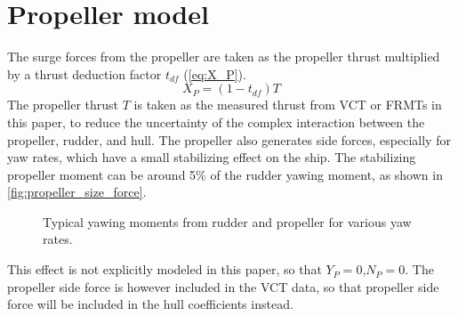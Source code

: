 \section{Propeller model} \label{sec:propeller}
The surge forces from the propeller are taken as the propeller thrust multiplied by a thrust deduction factor $t_{df}$ (\autoref{eq:X_P}).
\begin{equation}
    \label{eq:X_P}
    X_P = (1-t_{df})T
\end{equation}
The propeller thrust $T$ is taken as the measured thrust from VCT or FRMTs in this paper, to reduce the uncertainty of the complex interaction between the propeller, rudder, and hull. The propeller also generates side forces, especially for yaw rates, which have a small stabilizing effect on the ship. The stabilizing propeller moment can be around 5\% of the rudder yawing moment, as shown in \autoref{fig:propeller_size_force}.
\begin{figure}[h]
    \centering
    
    \caption{Typical yawing moments from rudder and propeller for various yaw rates.}
    \label{fig:propeller_size_force}
\end{figure}
This effect is not explicitly modeled in this paper, so that $Y_P=0$,$N_P=0$. The propeller side force is however included in the VCT data, so that propeller side force will be included in the hull coefficients instead.
